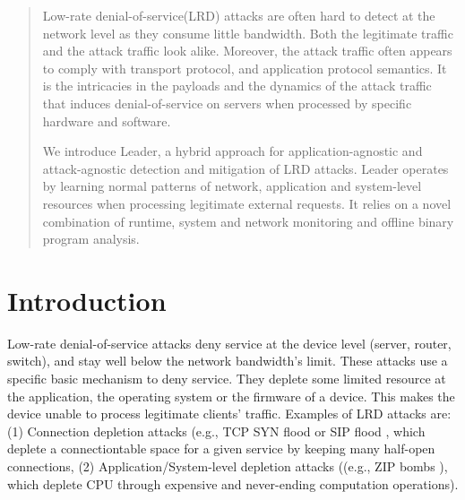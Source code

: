 \documentclass[conference]{IEEEtran}
\begin{document}


\maketitle



\begin{abstract}
Low-rate denial-of-service(LRD) attacks are often hard to detect at the network level as they consume little bandwidth. Both the legitimate traffic and the attack traffic look alike. Moreover, the attack traffic often appears to comply with transport protocol, and application protocol semantics. It is the intricacies in the payloads and the dynamics of the attack traffic that induces denial-of-service on servers when processed by specific hardware and software.

We introduce Leader, a hybrid approach for application-agnostic and attack-agnostic detection and mitigation of LRD attacks. Leader operates by learning normal patterns of network, application and system-level resources when processing legitimate external requests. It relies on a novel combination of runtime, system and network monitoring and offline binary program analysis.
\end{abstract}

\section{Introduction}

Low-rate denial-of-service attacks deny service at the device level (server, router, switch), and stay well below the network bandwidth’s limit. These attacks use a specific basic mechanism to deny service. They deplete some limited resource at the application, the operating system or the firmware of a device. This makes the device unable to process legitimate clients' traffic. Examples of LRD attacks
are: (1) Connection depletion attacks (e.g., TCP SYN flood \cite{manna2012review} or SIP flood \cite{luo2008cpu}, which deplete a connectiontable space for a given service by keeping many half-open connections, (2) Application/System-level depletion attacks ((e.g., ZIP bombs \cite{zip}), which deplete CPU
through expensive and never-ending computation operations).
\end{document}
